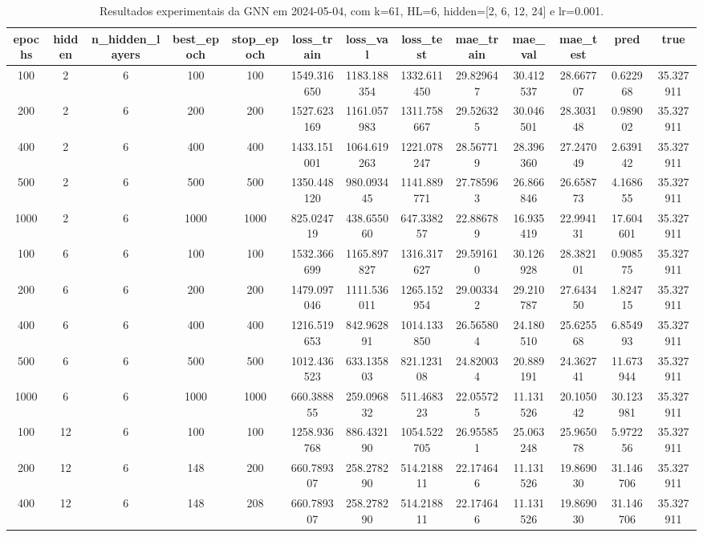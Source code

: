 \begin{table}[h]
\centering
\caption{Resultados experimentais da GNN em 2024-05-04, com k=61, HL=6, hidden=[2, 6, 12, 24] e lr=0.001.}
\label{tab:gnn_results_k61_hl6_d20240504}
\begin{tabular}{ccccccccccccc}
\toprule
epochs & hidden & n\_hidden\_layers & best\_epoch & stop\_epoch & loss\_train & loss\_val & loss\_test & mae\_train & mae\_val & mae\_test & pred & true \\
\midrule
100 & 2 & 6 & 100 & 100 & 1549.316650 & 1183.188354 & 1332.611450 & 29.829647 & 30.412537 & 28.667707 & 0.622968 & 35.327911 \\
200 & 2 & 6 & 200 & 200 & 1527.623169 & 1161.057983 & 1311.758667 & 29.526325 & 30.046501 & 28.303148 & 0.989002 & 35.327911 \\
400 & 2 & 6 & 400 & 400 & 1433.151001 & 1064.619263 & 1221.078247 & 28.567719 & 28.396360 & 27.247049 & 2.639142 & 35.327911 \\
500 & 2 & 6 & 500 & 500 & 1350.448120 & 980.093445 & 1141.889771 & 27.785963 & 26.866846 & 26.658773 & 4.168655 & 35.327911 \\
1000 & 2 & 6 & 1000 & 1000 & 825.024719 & 438.655060 & 647.338257 & 22.886789 & 16.935419 & 22.994131 & 17.604601 & 35.327911 \\
100 & 6 & 6 & 100 & 100 & 1532.366699 & 1165.897827 & 1316.317627 & 29.591610 & 30.126928 & 28.382101 & 0.908575 & 35.327911 \\
200 & 6 & 6 & 200 & 200 & 1479.097046 & 1111.536011 & 1265.152954 & 29.003342 & 29.210787 & 27.643450 & 1.824715 & 35.327911 \\
400 & 6 & 6 & 400 & 400 & 1216.519653 & 842.962891 & 1014.133850 & 26.565804 & 24.180510 & 25.625568 & 6.854993 & 35.327911 \\
500 & 6 & 6 & 500 & 500 & 1012.436523 & 633.135803 & 821.123108 & 24.820034 & 20.889191 & 24.362741 & 11.673944 & 35.327911 \\
1000 & 6 & 6 & 1000 & 1000 & 660.388855 & 259.096832 & 511.468323 & 22.055725 & 11.131526 & 20.105042 & 30.123981 & 35.327911 \\
100 & 12 & 6 & 100 & 100 & 1258.936768 & 886.432190 & 1054.522705 & 26.955851 & 25.063248 & 25.965078 & 5.972256 & 35.327911 \\
200 & 12 & 6 & 148 & 200 & 660.789307 & 258.278290 & 514.218811 & 22.174646 & 11.131526 & 19.869030 & 31.146706 & 35.327911 \\
400 & 12 & 6 & 148 & 208 & 660.789307 & 258.278290 & 514.218811 & 22.174646 & 11.131526 & 19.869030 & 31.146706 & 35.327911 \\

\end{tabular}
\end{table}
